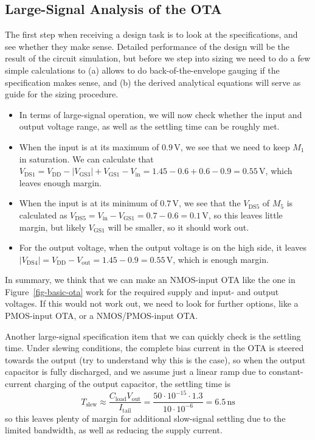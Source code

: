 \documentclass[
  a4paper,
  DIV=11,
  numbers=noendperiod]{scrartcl}
\providecommand{\tightlist}{%
  \setlength{\itemsep}{0pt}\setlength{\parskip}{0pt}}\usepackage{longtable,booktabs,array}
\begin{document}
\subsection{Large-Signal Analysis of the
OTA}\label{sec-basic-ota-large-signal}

The first step when receiving a design task is to look at the
specifications, and see whether they make sense. Detailed performance of
the design will be the result of the circuit simulation, but before we
step into sizing we need to do a few simple calculations to (a) allows
to do back-of-the-envelope gauging if the specification makes sense, and
(b) the derived analytical equations will serve as guide for the sizing
procedure.

\begin{itemize}
\tightlist
\item
  In terms of large-signal operation, we will now check whether the
  input and output voltage range, as well as the settling time can be
  roughly met.
\item
  When the input is at its maximum of \(0.9\,\text{V}\), we see that we
  need to keep \(M_1\) in saturation. We can calculate that
  \(V_\mathrm{DS1} = V_\mathrm{DD}- |V_\mathrm{GS3}| + V_\mathrm{GS1} - V_\mathrm{in} = 1.45 - 0.6 + 0.6 - 0.9 = 0.55\,\text{V}\),
  which leaves enough margin.
\item
  When the input is at its minimum of \(0.7\,\text{V}\), we see that the
  \(V_\mathrm{DS5}\) of \(M_5\) is calculated as
  \(V_\mathrm{DS5} = V_\mathrm{in} - V_\mathrm{GS1} = 0.7 - 0.6 = 0.1\,\text{V}\),
  so this leaves little margin, but likely \(V_\mathrm{GS1}\) will be
  smaller, so it should work out.
\item
  For the output voltage, when the output voltage is on the high side,
  it leaves
  \(|V_\mathrm{DS4}| = V_\mathrm{DD}- V_\mathrm{out} = 1.45 - 0.9 = 0.55\,\text{V}\),
  which is enough margin.
\end{itemize}

In summary, we think that we can make an NMOS-input OTA like the one in
Figure~\ref{fig-basic-ota} work for the required supply and input- and
output voltages. If this would not work out, we need to look for further
options, like a PMOS-input OTA, or a NMOS/PMOS-input OTA.

Another large-signal specification item that we can quickly check is the
settling time. Under slewing conditions, the complete bias current in
the OTA is steered towards the output (try to understand why this is the
case), so when the output capacitor is fully discharged, and we assume
just a linear ramp due to constant-current charging of the output
capacitor, the settling time is \[
T_\mathrm{slew} \approx \frac{C_\mathrm{load} V_\mathrm{out}}{I_\mathrm{tail}} = \frac{50 \cdot 10^{-15} \cdot 1.3}{10 \cdot 10^{-6}} = 6.5\,\text{ns}
\] so this leaves plenty of margin for additional slow-signal settling
due to the limited bandwidth, as well as reducing the supply current.
\end{document}
